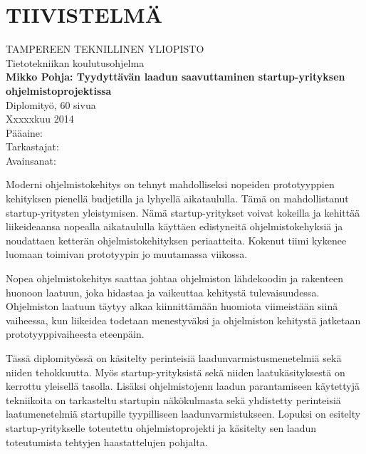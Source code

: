 \newpage
 
\setcounter{page}{1} %
 
\chapter*{TIIVISTELMÄ}
\begin{spacing}{1.0}
\textsf{TAMPEREEN TEKNILLINEN YLIOPISTO}\\
\textsf{Tietotekniikan koulutusohjelma}\\
{\bf \textsf{Mikko Pohja: Tyydyttävän laadun saavuttaminen startup-yrityksen ohjelmistoprojektissa}}\\
\textsf{Diplomityö, 60 sivua}\\
\textsf{Xxxxxkuu 2014}\\
\textsf{Pääaine: }\\
\textsf{Tarkastajat: }\\
\textsf{Avainsanat: }\\
\end{spacing}
 
\noindent
Moderni ohjelmistokehitys on tehnyt mahdolliseksi nopeiden prototyyppien kehityksen pienellä budjetilla ja lyhyellä aikataululla. Tämä on mahdollistanut startup-yritysten yleistymisen. Nämä startup-yritykset voivat kokeilla ja kehittää liikeideaansa nopealla aikataululla käyttäen edistyneitä ohjelmistokehyksiä ja noudattaen ketterän ohjelmistokehityksen periaatteita. Kokenut tiimi kykenee luomaan toimivan prototyypin jo muutamassa viikossa.
 
\noindent
Nopea ohjelmistokehitys saattaa johtaa ohjelmiston lähdekoodin ja rakenteen huonoon laatuun, joka hidastaa ja vaikeuttaa kehitystä tulevaisuudessa. Ohjelmiston laatuun täytyy alkaa kiinnittämään huomiota viimeistään siinä vaiheessa, kun liikeidea todetaan menestyväksi ja ohjelmiston kehitystä jatketaan prototyyppivaiheesta eteenpäin. 

\noindent
Tässä diplomityössä on käsitelty perinteisiä laadunvarmistusmenetelmiä sekä niiden tehokkuutta. Myös startup-yrityksistä sekä niiden laatukäsityksestä on kerrottu yleisellä tasolla. Lisäksi ohjelmistojenn laadun parantamiseen käytettyjä tekniikoita on tarkasteltu startupin näkökulmasta sekä yhdistetty perinteisiä laatumenetelmiä startupille tyypilliseen laadunvarmistukseen. Lopuksi on esitelty startup-yritykselle toteutettu ohjelmistoprojekti ja käsitelty sen laadun toteutumista tehtyjen haastattelujen pohjalta.

